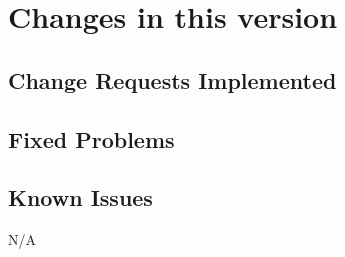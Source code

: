 \chapter{Changes in this version}

\section{Change Requests Implemented}


\section{Fixed Problems}


\section{Known Issues}
N/A